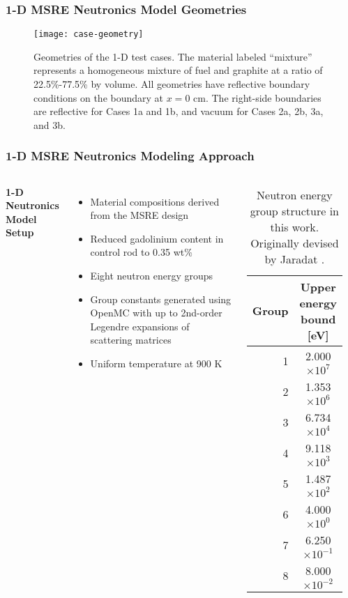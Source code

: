 \begin{frame}
  \frametitle{1-D MSRE Neutronics Model Geometries}
  \begin{figure}[htb!]
    \centering
    \texttt{[image: case-geometry]}
    \caption{Geometries of the 1-D test cases. The material labeled ``mixture'' represents a
      homogeneous mixture of fuel and graphite at a ratio of 22.5\%-77.5\% by volume. All geometries
      have reflective boundary conditions on the boundary at $x=0$ cm. The right-side boundaries are
      reflective for Cases 1a and 1b, and vacuum for Cases 2a, 2b, 3a, and 3b.}
    \label{fig:case-geom}
  \end{figure}
\end{frame}

\begin{frame}
  \frametitle{1-D MSRE Neutronics Modeling Approach}
  \begin{columns}
    \column{5.5cm}
    \textbf{1-D Neutronics Model Setup}
    \vspace{.2cm}

    \begin{itemize}
      \item Material compositions derived from the MSRE design
      \item Reduced gadolinium content in control rod to 0.35 wt\%
      \item Eight neutron energy groups
      \item Group constants generated using OpenMC with up to 2nd-order Legendre expansions of scattering
        matrices
      \item Uniform temperature at 900 K
    \end{itemize}
    \column{5.5cm}
    \begin{table}[h]
      \centering
      \caption{Neutron energy group structure in this work. Originally devised by Jaradat
      \cite{jaradat_development_2021-1}.}
      \begin{tabular}{r S}
        \toprule
        Group & {Upper energy bound [eV]} \\
         & 2.000$\times 10^7$ \\
        2 & 1.353$\times 10^6$ \\
        3 & 6.734$\times 10^4$ \\
        4 & 9.118$\times 10^3$ \\
        5 & 1.487$\times 10^2$ \\
        6 & 4.000$\times 10^0$ \\
        7 & 6.250$\times 10^{-1}$ \\
        8 & 8.000$\times 10^{-2}$ \\
        \bottomrule
      \end{tabular}
      \label{table:energy-group}
    \end{table}
  \end{columns}
\end{frame}

